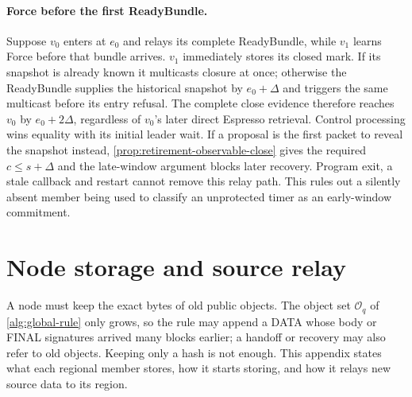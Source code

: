 \documentclass[11pt,a4paper]{article}
\begin{document}
\paragraph{Force before the first ReadyBundle.}
Suppose $v_0$ enters at $e_0$ and relays its complete ReadyBundle, while
$v_1$ learns Force before that bundle arrives. $v_1$ immediately stores
its closed mark. If its snapshot is already known it multicasts closure at once;
otherwise the ReadyBundle supplies the historical snapshot by
$e_0+\Delta$ and triggers the same multicast before its entry refusal.
The complete close evidence therefore reaches $v_0$ by $e_0+2\Delta$,
regardless of $v_0$'s later direct Espresso retrieval. Control processing
wins equality with its initial leader wait. If a proposal is the first
packet to reveal the snapshot instead, \cref{prop:retirement-observable-close}
gives the required $c\le s+\Delta$ and the late-window argument blocks
later recovery. Program exit, a stale callback and restart cannot
remove this relay path. This rules out a silently absent member being
used to classify an unprotected timer as an early-window commitment.

\section{Node storage and source relay}
\label{app:storage}
\label{sec:source-step}
\label{sec:source-retention}
A node must keep the exact bytes of old public objects. The object set
$\mathcal O_q$ of \cref{alg:global-rule} only grows, so the rule may
append a DATA whose body or FINAL signatures arrived many blocks
earlier; a handoff or recovery may also refer to old objects. Keeping
only a hash is not enough. This appendix states what each regional member stores, how it starts storing, and how it relays new source data to its region.
\end{document}
